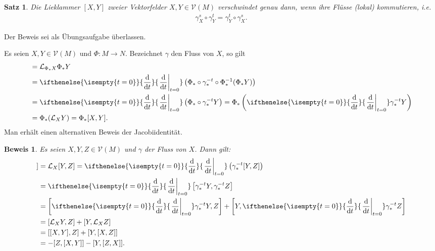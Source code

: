 \documentclass[paper=A4, twoside, chapterprefix=true, bibliography=totoc, headsepline]{scrbook}
\newcommand{\dop}{\mathrm{d}}
\newcommand{\difffrac}[3][]{\ifthenelse{\isempty{#1}}{\frac{\dop #2}{\dop #3}}{\left. \frac{\dop #2}{\dop #3} \right|_{#1}}}
\theoremstyle{plain}
\newtheorem{Satz}[Dfn]{Satz}
\theoremstyle{nonumberplain}
\newtheorem{bew}{Beweis}
\theoremstyle{empty}
\theoremstyle{break}
\begin{document}

\begin{Satz}
  Die Lieklammer $[X,Y]$ zweier Vektorfelder $X,Y \in \mathcal V(M)$ verschwindet genau dann, wenn ihre Fl\"usse (lokal) kommutieren, i.e.
  \begin{align*}
    \gamma_X^s \circ \gamma_Y^t = \gamma_Y^t \circ \gamma_X^s.
  \end{align*}
\end{Satz}

Der Beweis sei als \"Ubungsaufgabe \"uberlassen.

Es seien $X,Y \in \mathcal V(M)$ und $\Phi \colon M \to N$.
Bezeichnet $\gamma$ den Fluss von $X$, so gilt
\begin{align*}
  [\Phi_{\ast}X,\Phi_{\ast}Y] & = \mathcal L_{\Phi_{\ast}X} \Phi_{\ast}Y\\
  & = \difffrac[t=0]{}{t}\left(\Phi_{\ast} \circ \gamma_{\ast}^{-t} \circ \Phi_{\ast}^{-1}(\Phi_{\ast}Y)\right)\\
  & = \difffrac[t=0]{}{t} \left(\Phi_{\ast} \circ \gamma_{\ast}^{-t}Y\right) 
  = \Phi_{\ast}\left(\difffrac[t=0]{}{t}\gamma_{\ast}^{-t}Y\right)\\
  & = \Phi_{\ast}(\mathcal L_XY) = \Phi_{\ast}[X,Y].
\end{align*}
Man erh\"alt einen alternativen Beweis der Jacobiidentit\"at.


\begin{bew}
  Es seien $X,Y, Z \in \mathcal V(M)$ und $\gamma$ der Fluss von $X$.
  Dann gilt:
  \begin{align*}
    [X,[Y,Z]] & = \mathcal L_X[Y,Z] 
    = \difffrac[t=0]{}{t}\left(\gamma_{\ast}^{-t}[Y,Z]\right)\\
    & = \difffrac[t=0]{}{t}\left[\gamma_{\ast}^{-t}Y,\gamma_{\ast}^{-t}Z\right]\\
    & = \left[\difffrac[t=0]{}{t} \gamma_{\ast}^{-t}Y,Z\right] + \left[Y, \difffrac[t=0]{}{t}\gamma_{\ast}^{-t}Z\right]\\
    & = [\mathcal L_XY,Z] + [Y,\mathcal L_XZ]\\
    & = [[X,Y],Z] + [Y,[X,Z]]\\
    & = -[Z,[X,Y]] - [Y,[Z,X]].
  \end{align*}
\end{bew}


\end{document}
